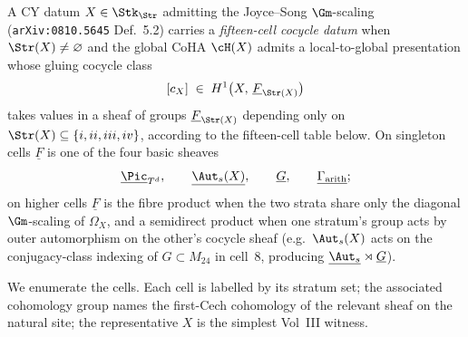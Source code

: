 \begin{definition}
\label{gluing:thm:fifteen-cell-classification}
A CY datum \(X\in\Stk_{\Str}\) admitting the Joyce--Song
\(\Gm\)-scaling (\texttt{arXiv:0810.5645} Def.~5.2) carries a
\emph{fifteen-cell cocycle datum} when \(\Str(X)\neq\varnothing\) and
the global CoHA \(\cH(X)\) admits a local-to-global presentation whose
gluing cocycle class
\[
[c_{X}]\;\in\;H^{1}\bigl(X,\,\underline{F}_{\Str(X)}\bigr)
\]
takes values in a sheaf of groups $\underline{F}_{\Str(X)}$ depending
only on $\Str(X)\subseteq\{i,ii,iii,iv\}$, according to the
fifteen-cell table below. On singleton cells $\underline{F}$ is one
of the four basic sheaves
\[
\underline{\Pic}_{T^{d}},\qquad
\underline{\Aut_{s}(X)},\qquad
\underline{G},\qquad
\underline{\Gamma_{\mathrm{arith}}};
\]
on higher cells $\underline{F}$ is the fibre product when the two
strata share only the diagonal $\Gm$-scaling of $\Omega_{X}$, and a
semidirect product when one stratum's group acts by outer
automorphism on the other's cocycle sheaf (e.g.\ $\Aut_{s}(X)$ acts
on the conjugacy-class indexing of $G \subset M_{24}$ in cell~$8$,
producing $\underline{\Aut_{s}}\rtimes\underline{G}$).
\end{definition}

\noindent We enumerate the cells. Each cell is labelled by its stratum
set; the associated cohomology group names the first-Cech cohomology
of the relevant sheaf on the natural site; the representative $X$ is
the simplest Vol~III witness.


